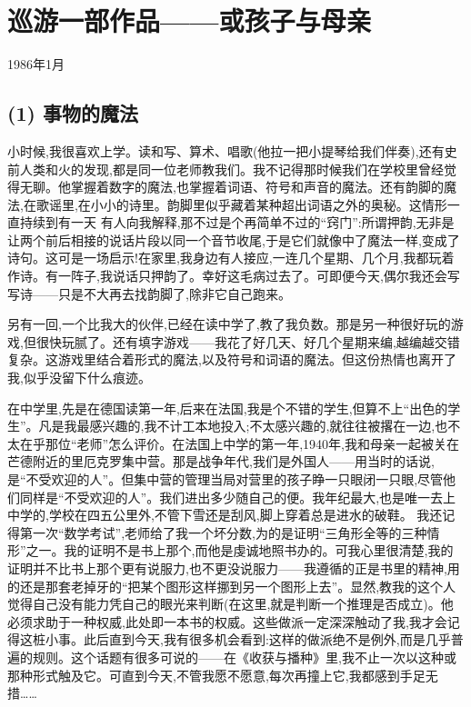\chapter{巡游一部作品——或孩子与母亲}

\noindent 1986年1月\par

\section{(1) 事物的魔法}

 小时候,我很喜欢上学。读和写、算术、唱歌(他拉一把小提琴给我们伴奏),还有史前人类和火的发现,都是同一位老师教我们。我不记得那时候我们在学校里曾经觉得无聊。他掌握着数字的魔法,也掌握着词语、符号和声音的魔法。还有韵脚的魔法,在歌谣里,在小小的诗里。韵脚里似乎藏着某种超出词语之外的奥秘。这情形一直持续到有一天
有人向我解释,那不过是个再简单不过的“窍门”:所谓押韵,无非是让两个前后相接的说话片段以同一个音节收尾,于是它们就像中了魔法一样,变成了诗句。这可是一场启示!在家里,我身边有人接应,一连几个星期、几个月,我都玩着作诗。有一阵子,我说话只押韵了。幸好这毛病过去了。可即便今天,偶尔我还会写写诗——只是不大再去找韵脚了,除非它自己跑来。

另有一回,一个比我大的伙伴,已经在读中学了,教了我负数。那是另一种很好玩的游戏,但很快玩腻了。还有填字游戏——我花了好几天、好几个星期来编,越编越交错复杂。这游戏里结合着形式的魔法,以及符号和词语的魔法。但这份热情也离开了我,似乎没留下什么痕迹。

在中学里,先是在德国读第一年,后来在法国,我是个不错的学生,但算不上“出色的学生”。凡是我最感兴趣的,我不计工本地投入;不太感兴趣的,就往往被撂在一边,也不太在乎那位“老师”怎么评价。在法国上中学的第一年,1940年,我和母亲一起被关在芒德附近的里厄克罗集中营。那是战争年代,我们是外国人——用当时的话说,是“不受欢迎的人”。但集中营的管理当局对营里的孩子睁一只眼闭一只眼,尽管他们同样是“不受欢迎的人”。我们进出多少随自己的便。我年纪最大,也是唯一去上中学的,学校在四五公里外,不管下雪还是刮风,脚上穿着总是进水的破鞋。 我还记得第一次“数学考试”,老师给了我一个坏分数,为的是证明“三角形全等的三种情形”之一。我的证明不是书上那个,而他是虔诚地照书办的。可我心里很清楚,我的证明并不比书上那个更有说服力,也不更没说服力——我遵循的正是书里的精神,用的还是那套老掉牙的“把某个图形这样挪到另一个图形上去”。显然,教我的这个人觉得自己没有能力凭自己的眼光来判断(在这里,就是判断一个推理是否成立)。他必须求助于一种权威,此处即一本书的权威。这些做派一定深深触动了我,我才会记得这桩小事。此后直到今天,我有很多机会看到:这样的做派绝不是例外,而是几乎普遍的规则。这个话题有很多可说的——在《收获与播种》里,我不止一次以这种或那种形式触及它。可直到今天,不管我愿不愿意,每次再撞上它,我都感到手足无措……

